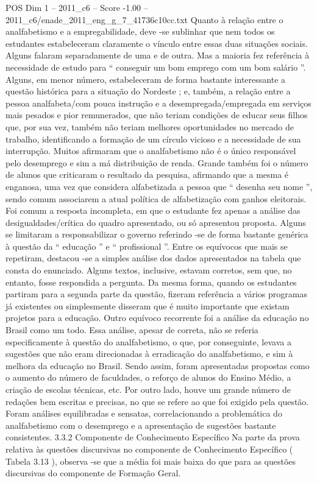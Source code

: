\begin{textsample}{POS Dim 1 – 2011\_c6 – Score -1.00 – 2011\_c6/enade\_2011\_eng\_g\_7\_41736c10cc.txt}
Quanto à relação entre o analfabetismo e a empregabilidade, deve -se sublinhar que nem todos os estudantes estabeleceram claramente o vínculo entre essas duas situações sociais.
Alguns falaram separadamente de uma e de outra.
Mas a maioria fez referência à necessidade de estudo para “ conseguir um bom emprego com um bom salário ”.
Alguns, em menor número, estabeleceram de forma bastante interessante a questão histórica para a situação do Nordeste ; e, também, a relação entre a pessoa analfabeta/com pouca instrução e a desempregada/empregada em serviços mais pesados e pior remunerados, que não teriam condições de educar seus filhos que, por sua vez, também não teriam melhores oportunidades no mercado de trabalho, identificando a formação de um círculo vicioso e a necessidade de sua interrupção.
Muitos afirmaram que o analfabetismo não é o único responsável pelo desemprego e sim a má distribuição de renda.
Grande também foi o número de alunos que criticaram o resultado da pesquisa, afirmando que a mesma é enganosa, uma vez que considera alfabetizada a pessoa que “ desenha seu nome ”, sendo comum associarem a atual política de alfabetização com ganhos eleitorais.
Foi comum a resposta incompleta, em que o estudante fez apenas a análise das desigualdades/crítica do quadro apresentado, ou só apresentou proposta.
Alguns se limitaram a responsabilizar o governo referindo -se de forma bastante genérica à questão da “ educação ” e “ profissional ”.
Entre os equívocos que mais se repetiram, destacou -se a simples análise dos dados apresentados na tabela que consta do enunciado.
Alguns textos, inclusive, estavam corretos, sem que, no entanto, fosse respondida a pergunta.
Da mesma forma, quando os estudantes partiram para a segunda parte da questão, fizeram referência a vários programas já existentes ou simplesmente disseram que é muito importante que existam projetos para a educação.
Outro equívoco recorrente foi a análise da educação no Brasil como um todo.
Essa análise, apesar de correta, não se referia especificamente à questão do analfabetismo, o que, por conseguinte, levava a sugestões que não eram direcionadas à erradicação do analfabetismo, e sim à melhora da educação no Brasil.
Sendo assim, foram apresentadas propostas como o aumento do número de faculdades, o reforço de alunos do Ensino Médio, a criação de escolas técnicas, etc.
Por outro lado, houve um grande número de redações bem escritas e precisas, no que se refere ao que foi exigido pela questão.
Foram análises equilibradas e sensatas, correlacionando a problemática do analfabetismo com o desemprego e a apresentação de sugestões bastante consistentes. 3.3.2 Componente de Conhecimento Específico Na parte da prova relativa às questões discursivas no componente de Conhecimento Específico ( Tabela 3.13 ), observa -se que a média foi mais baixa do que para as questões discursivas do componente de Formação Geral.

\end{textsample}
